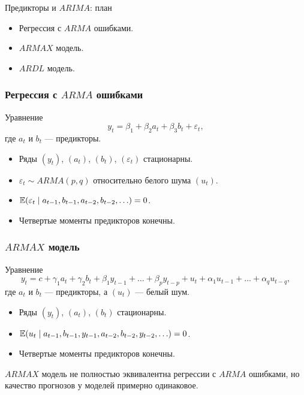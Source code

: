 
\begin{frame} %


\end{frame}

\begin{frame}{Предикторы и $ARIMA$: план}
  \begin{itemize}[<+->]
    \item Регрессия с $ARMA$ ошибками.
    \item $ARMAX$ модель.
    \item $ARDL$ модель.
  \end{itemize}
\end{frame}

\begin{frame}
  \frametitle{Регрессия с $ARMA$ ошибками}
  
  \begin{block}{Уравнение}
    \[
      y_t = \beta_1 + \beta_2 a_t + \beta_3 b_t + \varepsilon_t,
    \]
  где $a_t$ и $b_t$ — предикторы.
  \end{block}
  \pause
  \begin{itemize}
  \item Ряды $(y_t)$, $(a_t)$, $(b_t)$, $(\varepsilon_t)$ стационарны.
  \item $\varepsilon_t \sim ARMA(p, q)$ относительно белого шума $(u_t)$.
\item $\mathbb{E}(\varepsilon_t \mid a_{t-1}, b_{t-1}, a_{t-2}, b_{t-2}, \ldots) = 0$.
\item Четвертые моменты предикторов конечны.  
\end{itemize}
  
\end{frame}


\begin{frame}
  \frametitle{$ARMAX$ модель}

  \begin{block}{Уравнение}
    \[
      y_t = c + \gamma_1 a_t + \gamma_2 b_t + \beta_1 y_{t-1} + \ldots + \beta_p y_{t-p} + u_t + \alpha_1 u_{t-1} + \ldots + \alpha_q u_{t-q},
    \]
  где $a_t$ и $b_t$ — предикторы, а $(u_t)$ — белый шум.
  \end{block}
\pause
  \begin{itemize}[<+->]
  \item Ряды $(y_t)$, $(a_t)$, $(b_t)$ стационарны.
\item $\mathbb{E}(u_t \mid a_{t-1}, b_{t-1}, y_{t-1}, a_{t-2}, b_{t-2}, y_{t-2}, \ldots) = 0$.
\item Четвертые моменты предикторов конечны.  
\end{itemize}
  \pause
  $ARMAX$ модель не полностью эквивалентна регрессии с $ARMA$ ошибками, но качество прогнозов у моделей примерно одинаковое.  

\end{frame}


